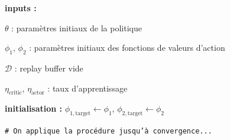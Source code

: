 \begin{algorithm}[H]
    \caption{Soft Actor-Critic}
    \label{alg:sac_training}

    \vspace{10pt}

    \textbf{inputs :}

    \hspace{15pt} $\theta$ : paramètres initiaux de la politique

    \hspace{15pt} $\phi_1$, $\phi_2$ : paramètres initiaux des fonctions de valeurs d'action

    \hspace{15pt} $\mathcal{D}$ : replay buffer vide

    \hspace{15pt} $\eta_{\text{critic}}$, $\eta_{\text{actor}}$ : taux d'apprentissage

    \vspace{10pt}


    \textbf{initialisation :}
    $\phi_{1, \text{target}} \leftarrow \phi_1$,
    $\phi_{2, \text{target}} \leftarrow \phi_2$

    \vspace{10pt}

    \textcolor{PineGreen}{\texttt{\# On applique la procédure jusqu'à convergence... }}

\end{algorithm}
